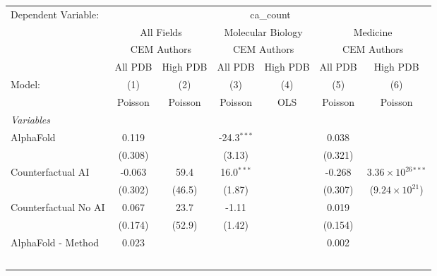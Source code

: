 \begingroup
\centering
\begin{tabular}{lcccccc}
   \tabularnewline \midrule \midrule
   Dependent Variable: & \multicolumn{6}{c}{ca\_count}\\
 & \multicolumn{2}{c}{All Fields} & \multicolumn{2}{c}{Molecular Biology} & \multicolumn{2}{c}{Medicine} \\
\cmidrule(lr){2-3} \cmidrule(lr){4-5} \cmidrule(lr){6-7}
 & \multicolumn{2}{c}{CEM Authors} & \multicolumn{2}{c}{CEM Authors} & \multicolumn{2}{c}{CEM Authors} \\
\cmidrule(lr){2-3} \cmidrule(lr){4-5} \cmidrule(lr){6-7}
 & \multicolumn{1}{c}{All PDB} & \multicolumn{1}{c}{High PDB} & \multicolumn{1}{c}{All PDB} & \multicolumn{1}{c}{High PDB} & \multicolumn{1}{c}{All PDB} & \multicolumn{1}{c}{High PDB} \\
\cmidrule(lr){2-2} \cmidrule(lr){3-3} \cmidrule(lr){4-4} \cmidrule(lr){5-5} \cmidrule(lr){6-6} \cmidrule(lr){7-7}
   Model:                                                     & (1)          & (2)     & (3)           & (4)  & (5)          & (6)\\  
                                                              &  Poisson     & Poisson & Poisson       & OLS  & Poisson      & Poisson\\  
   \midrule
   \emph{Variables}\\
   AlphaFold                                                  & 0.119        &         & -24.3$^{***}$ &      & 0.038        &   \\   
                                                              & (0.308)      &         & (3.13)        &      & (0.321)      &   \\   
   Counterfactual AI                                          & -0.063       & 59.4    & 16.0$^{***}$  &      & -0.268       & $3.36\times 10^{26}$$^{***}$\\    
                                                              & (0.302)      & (46.5)  & (1.87)        &      & (0.307)      & ($9.24\times 10^{21}$)\\    
   Counterfactual No AI                                       & 0.067        & 23.7    & -1.11         &      & 0.019        &   \\   
                                                              & (0.174)      & (52.9)  & (1.42)        &      & (0.154)      &   \\   
   AlphaFold - Method                                         & 0.023        &         &               &      & 0.002        &   \\   
$$
\end{tabular}
